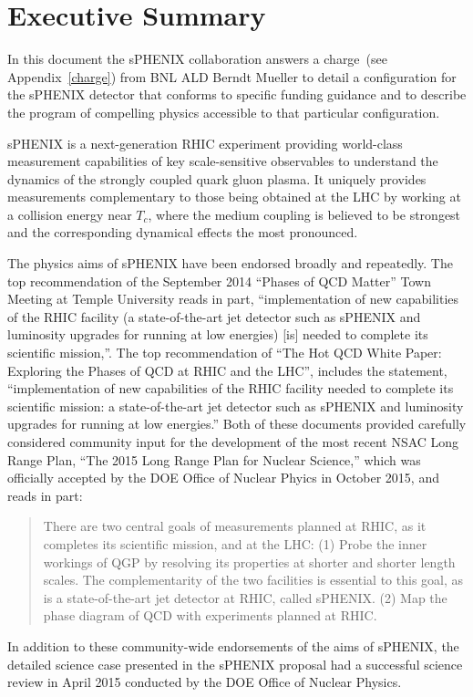 \section*{Executive Summary}
\label{executive_summary}
\setcounter{page}{1}

\nocite{*}

In this document the sPHENIX collaboration answers a charge~(see
Appendix~\ref{charge}) from BNL ALD Berndt Mueller to detail a
configuration for the sPHENIX detector that conforms to specific
funding guidance and to describe the program of compelling physics
accessible to that particular configuration.

sPHENIX is a next-generation RHIC experiment providing world-class
measurement capabilities of key scale-sensitive observables to
understand the dynamics of the strongly coupled quark gluon plasma.
It uniquely provides measurements complementary to those being
obtained at the LHC by working at a collision energy near $T_c$, where
the medium coupling is believed to be strongest and the corresponding
dynamical effects the most pronounced.

The physics aims of sPHENIX have been endorsed broadly and repeatedly.
The top recommendation of the September 2014 “Phases of QCD Matter”
Town Meeting at Temple University reads in part, ``implementation of
new capabilities of the RHIC facility (a state-of-the-art jet detector
such as sPHENIX and luminosity upgrades for running at low energies)
[is] needed to complete its scientific mission,''.  The top
recommendation of ``The Hot QCD White Paper: Exploring the Phases of
QCD at RHIC and the LHC'', includes the statement, ``implementation of
new capabilities of the RHIC facility needed to complete its
scientific mission: a state-of-the-art jet detector such as sPHENIX
and luminosity upgrades for running at low energies.'' Both of these
documents provided carefully considered community input for the
development of the most recent NSAC Long Range Plan, ``The 2015 Long
Range Plan for Nuclear Science,'' which was officially accepted by the
DOE Office of Nuclear Phyics in October 2015, and reads in part:

\blockquote{There are two central goals of measurements planned at
  RHIC, as it completes its scientific mission, and at the LHC: (1)
  Probe the inner workings of QGP by resolving its properties at
  shorter and shorter length scales. The complementarity of the two
  facilities is essential to this goal, as is a state-of-the-art jet
  detector at RHIC, called sPHENIX. (2) Map the phase diagram of QCD
  with experiments planned at RHIC.}

In addition to these community-wide endorsements of the aims of
sPHENIX, the detailed science case presented in the sPHENIX proposal
had a successful science review in April 2015 conducted by the DOE
Office of Nuclear Physics.




